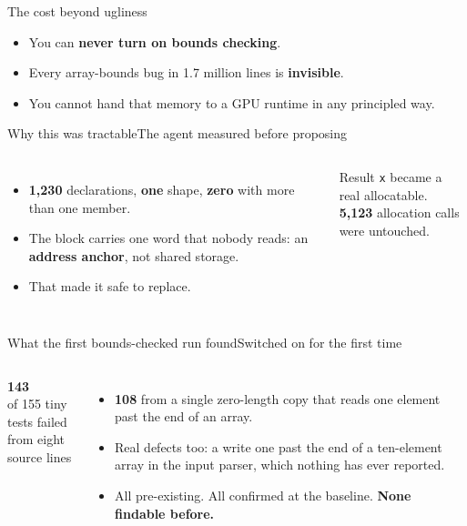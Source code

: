 \documentclass[aspectratio=169]{beamer}
\newcommand{\cplx}[1]{{\footnotesize\color{cookieMuted}#1}}
\begin{document}
\begin{frame}{The cost beyond ugliness}
  \begin{itemize}\setlength\itemsep{8pt}
    \item You can \textbf{never turn on bounds checking}.
    \item Every array-bounds bug in 1.7 million lines is \textbf{invisible}.
    \item You cannot hand that memory to a GPU runtime in any principled way.
  \end{itemize}
\end{frame}

\begin{frame}{Why this was tractable}{The agent measured before proposing}
  \begin{columns}[T,onlytextwidth]
      \begin{itemize}\setlength\itemsep{5pt}
        \item \textbf{1,230} declarations, \textbf{one} shape, \textbf{zero} with more than one member.
        \item The block carries one word that nobody reads: an \textbf{address anchor}, not shared storage.
        \item That made it safe to replace.
      \end{itemize}
      \begin{exampleblock}{Result}
        \texttt{x} became a real allocatable.\\
        \textbf{5,123} allocation calls were untouched.
      \end{exampleblock}
  \end{columns}
\end{frame}

\begin{frame}{What the first bounds-checked run found}{Switched on for the first time}
  \begin{columns}[T,onlytextwidth]
      \centering
      {\fontsize{48}{52}\selectfont\color{cookieAccent}\textbf{143}}\\[.2em]
      of 155 tiny tests failed\\[.3em]
      \cplx{from eight source lines}
      \begin{itemize}\setlength\itemsep{5pt}
        \item \textbf{108} from a single zero-length copy that reads one element past the end of an array.
        \item Real defects too: a write one past the end of a ten-element array in the input parser, which nothing has ever reported.
        \item All pre-existing. All confirmed at the baseline. \textbf{None findable before.}
      \end{itemize}
  \end{columns}
\end{frame}
\end{document}
